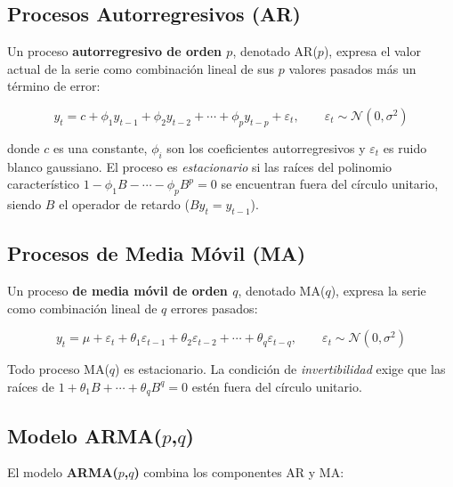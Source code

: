\documentclass[12pt, a4paper]{article}
\begin{document}
\subsection{Procesos Autorregresivos (AR)}

Un proceso \textbf{autorregresivo de orden $p$}, denotado AR($p$), expresa el
valor actual de la serie como combinación lineal de sus $p$ valores pasados
más un término de error:

\begin{defbox}
\begin{equation}
  y_t = c + \phi_1 y_{t-1} + \phi_2 y_{t-2} + \cdots + \phi_p y_{t-p} + \varepsilon_t,
  \qquad \varepsilon_t \sim \mathcal{N}(0,\sigma^2)
  \label{eq:ar}
\end{equation}
\end{defbox}

donde $c$ es una constante, $\phi_i$ son los coeficientes autorregresivos y
$\varepsilon_t$ es ruido blanco gaussiano. El proceso es \emph{estacionario}
si las raíces del polinomio característico $1 - \phi_1 B - \cdots - \phi_p B^p = 0$
se encuentran fuera del círculo unitario, siendo $B$ el operador de retardo
($B y_t = y_{t-1}$).

\subsection{Procesos de Media Móvil (MA)}

Un proceso \textbf{de media móvil de orden $q$}, denotado MA($q$), expresa la
serie como combinación lineal de $q$ errores pasados:

\begin{defbox}
\begin{equation}
  y_t = \mu + \varepsilon_t + \theta_1 \varepsilon_{t-1} + \theta_2 \varepsilon_{t-2}
        + \cdots + \theta_q \varepsilon_{t-q},
  \qquad \varepsilon_t \sim \mathcal{N}(0,\sigma^2)
  \label{eq:ma}
\end{equation}
\end{defbox}

Todo proceso MA($q$) es estacionario. La condición de \emph{invertibilidad}
exige que las raíces de $1 + \theta_1 B + \cdots + \theta_q B^q = 0$ estén
fuera del círculo unitario.

\subsection{Modelo ARMA($p$,$q$)}

El modelo \textbf{ARMA($p$,$q$)} combina los componentes AR y MA:
\end{document}
